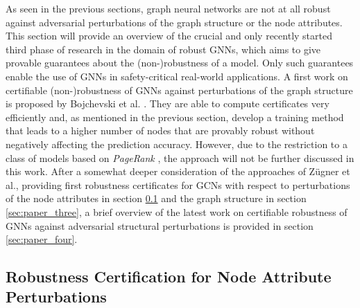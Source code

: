 \documentclass[a4paper,preprint]{sig-alternate}
\begin{document}
As seen in the previous sections, graph neural networks are not at all robust against adversarial perturbations of the graph
structure or the node attributes. This section will provide an overview of the crucial and only recently started 
third phase of research in the domain of robust GNNs, which aims to give provable guarantees about the (non-)robustness of a model.
Only such guarantees enable the use of GNNs in safety-critical real-world applications.\newline
A first work on certifiable (non-)robustness of GNNs against perturbations of the graph structure
is proposed by Bojchevski et al. \cite{bojchevski2019certifiable}. They are able to compute certificates very efficiently
and, as mentioned in the previous section, develop a training method that leads to a higher number of nodes that are provably robust without
negatively affecting the prediction accuracy. However, due to the restriction to a class of models
based on \textit{PageRank} \cite{10.1145/3394486.3403217}, the approach will not be further discussed in this work.\newline 
After a somewhat deeper consideration of the approaches of Zügner et al., providing first robustness certificates for GCNs with respect to 
perturbations of the node attributes in section \ref{sec:paper_two} and the graph structure in section \ref{sec:paper_three},
a brief overview of the latest work on certifiable robustness of GNNs against adversarial structural perturbations is provided 
in section \ref{sec:paper_four}.

\subsection{Robustness Certification for Node Attribute Perturbations}
\label{sec:paper_two}
\end{document}
